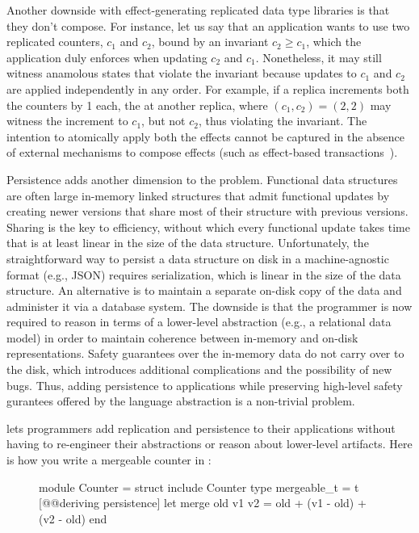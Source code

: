 Another downside with effect-generating replicated data type libraries
is that they don't compose. For instance, let us say that an
application wants to use two replicated counters, $c_1$ and $c_2$,
bound by an invariant $c_2 \ge c_1$, which the application duly
enforces when updating $c_2$ and $c_1$. Nonetheless, it may still
witness anamolous states that violate the invariant because updates to
$c_1$ and $c_2$ are applied independently in any order. For example,
if a replica increments both the counters by 1 each, the  at
another replica, where $(c_1,c_2) = (2,2)$ may witness the increment
to $c_1$, but not $c_2$, thus violating the invariant. The intention
to atomically apply both the effects cannot be captured in the absence
of external mechanisms to compose effects (such as effect-based
transactions~\cite{pldi15}).  

Persistence adds another dimension to the problem. Functional data
structures are often large in-memory linked structures that admit
functional updates by creating newer versions that share most of their
structure with previous versions. Sharing is the key to efficiency,
without which every functional update takes time that is at least
linear in the size of the data structure. Unfortunately, the
straightforward way to persist a data structure on disk in a
machine-agnostic format (e.g., JSON) requires serialization, which is
linear in the size of the data structure. An alternative is to
maintain a separate on-disk copy of the data and administer it via a
database system. The downside is that the programmer is now required
to reason in terms of a lower-level abstraction (e.g., a relational
data model) in order to maintain coherence between in-memory and
on-disk representations. Safety guarantees over the in-memory data do
not carry over to the disk, which introduces additional complications
and the possibility of new bugs. Thus, adding persistence to
applications while preserving high-level safety gurantees offered by
the language abstraction is a non-trivial problem.

\name lets programmers add replication and persistence to their
applications without having to re-engineer their abstractions or
reason about lower-level artifacts. Here is how you write a mergeable
counter in \name:
\begin{figure}[!h]
  \begin{ocaml}
    module Counter = struct
      include Counter
      type mergeable_t = t [@@deriving persistence]
      let merge old v1 v2 = old + (v1 - old) + (v2 - old)
    end
  \end{ocaml}
\end{figure}


